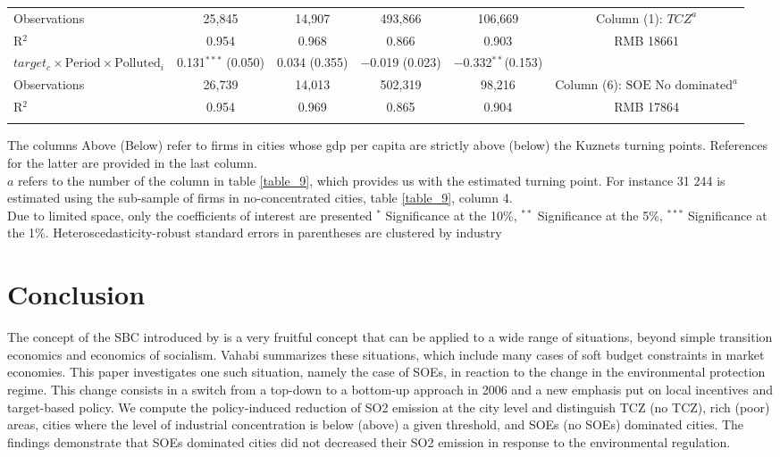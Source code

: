 \documentclass[12pt]{article}
\begin{document}
\begin{table}[!htb]
\begin{adjustbox}{width=\textwidth, totalheight=\baselineskip,keepaspectratio}
\begin{tabular}{@{\extracolsep{5pt}}lccccc}
Observations  & 25,845 & 14,907 & 493,866 & 106,669 & Column (1): $TCZ^a$\\ 
R$^{2}$  &0.954 & 0.968 & 0.866 & 0.903&  RMB  18661\\ 
\hline 
$target_c \times \text{Period} \times \text{Polluted}_i$  &  0.131$^{***}$  (0.050) & 0.034 (0.355)  &$-$0.019 (0.023) & $-$0.332$^{**}$(0.153)& \\
Observations  & 26,739 & 14,013 & 502,319 & 98,216 &  Column (6): $\text{SOE No dominated}^a$ \\ 
R$^{2}$  & 0.954 & 0.969 & 0.865 & 0.904 &  RMB 17864\\
\hline \\[-1.8ex] 
\end{tabular}
\end{adjustbox}
\begin{tablenotes} 
 \small 
 \item \footnotesize{
The columns Above (Below) refer to firms in cities whose gdp per capita are strictly above (below) the Kuznets turning points. References for the latter are provided in the last column. \\
$a$ refers to the number of the column in table \ref{table_9}, which provides us with the estimated turning point. For instance 31 244 is estimated using the sub-sample of firms in no-concentrated cities, table \ref{table_9}, column 4. \\
Due to limited space, only the coefficients of interest are presented $^{*}$ Significance at the 10\%, $^{**}$ Significance at the 5\%, $^{***}$ Significance at the 1\%. Heteroscedasticity-robust standard errors in parentheses are clustered by industry 
}
\end{tablenotes}
\end{table}
\section{Conclusion} \label{conclusion} 



The concept of the SBC introduced by \cite{Kornai1993-kg} is a very fruitful concept that can be applied to a wide range of situations, beyond simple transition economics and economics of socialism. Vahabi \citeyear{Vahabi2001-bp, Vahabi2014-qy} summarizes these situations, which include many cases of soft budget constraints in market economies. This paper investigates one such situation, namely the case of SOEs, in reaction to the change in the environmental protection regime. This change consists in a switch from a top-down to a bottom-up approach in 2006 and a new emphasis put on local incentives and target-based policy. We compute the policy-induced reduction of SO2 emission at the city level and distinguish TCZ (no TCZ), rich (poor) areas, cities where the level of industrial concentration is below (above) a given threshold, and SOEs (no SOEs) dominated cities. The findings demonstrate that SOEs dominated cities did not decreased their SO2 emission in response to the environmental regulation. 
\end{document}
